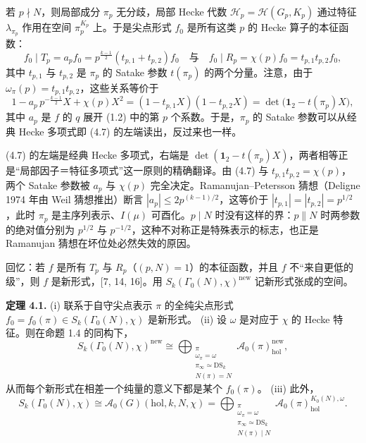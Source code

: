 若 $p\nmid N$，则局部成分 $\pi_p$ 无分歧，局部 Hecke 代数 $\mathcal{H}_p=\mathcal{H}(G_p,K_p)$ 通过特征 $\lambda_{\pi_p}$ 作用在空间 $\pi_p^{K_p}$ 上。于是尖点形式 $f_0$ 是所有这类 $p$ 的 Hecke 算子的本征函数：
\begin{equation*}\tag{4.6}
f_0\mid T_p=a_pf_0=p^{\frac{k-1}{2}}(t_{p,1}+t_{p,2})f_0
\quad\text{与}\quad
f_0\mid R_p=\chi(p)f_0=t_{p,1}t_{p,2}f_0 ,
\end{equation*}
其中 $t_{p,1}$ 与 $t_{p,2}$ 是 $\pi_p$ 的 Satake 参数 $t(\pi_p)$ 的两个分量。注意，由于 $\omega_\pi(p)=t_{p,1}t_{p,2}$，这些关系等价于
\begin{equation*}\tag{4.7}
1-a_p\,p^{-\frac{k-1}{2}}X+\chi(p)X^2=(1-t_{p,1}X)(1-t_{p,2}X)=\det\bigl(\mathbf{1}_2-t(\pi_p)X\bigr),
\end{equation*}
其中 $a_p$ 是 $f$ 的 $q$ 展开 (1.2) 中的第 $p$ 个系数。于是，$\pi_p$ 的 Satake 参数可以从经典 Hecke 多项式即 (4.7) 的左端读出，反过来也一样。

\begin{annote}
(4.7) 的左端是经典 Hecke 多项式，右端是 $\det(\mathbf{1}_2-t(\pi_p)X)$，两者相等正是“局部因子＝特征多项式”这一原则的精确翻译。由 (4.7) 与 $t_{p,1}t_{p,2}=\chi(p)$，两个 Satake 参数被 $a_p$ 与 $\chi(p)$ 完全决定。Ramanujan–Petersson 猜想（Deligne 1974 年由 Weil 猜想推出）断言 $|a_p|\le2p^{(k-1)/2}$，这等价于 $|t_{p,1}|=|t_{p,2}|=p^{1/2}$，此时 $\pi_p$ 是主序列表示、$I(\mu)$ 可酉化。$p\mid N$ 时没有这样的界：$p\|N$ 时两参数的绝对值分别为 $p^{1/2}$ 与 $p^{-1/2}$，这种不对称正是特殊表示的标志，也正是 Ramanujan 猜想在坏位处必然失效的原因。

\par{}
\end{annote}

回忆：若 $f$ 是所有 $T_p$ 与 $R_p$（$(p,N)=1$）的本征函数，并且 $f$ 不“来自更低的级”，则 $f$ 是新形式，[7, 14, 16]。用 $S_k(\Gamma_0(N),\chi)^{\mathrm{new}}$ 记新形式张成的空间。

\medskip\noindent\textbf{定理 4.1.}\quad
(i) 联系于自守尖点表示 $\pi$ 的全纯尖点形式 $f_0=f_0(\pi)\in S_k(\Gamma_0(N),\chi)$ 是新形式。
(ii) 设 $\omega$ 是对应于 $\chi$ 的 Hecke 特征。则在命题 1.4 的同构下，
\[
S_k(\Gamma_0(N),\chi)^{\mathrm{new}}\cong
\bigoplus_{\substack{\pi\\ \omega_\pi=\omega\\ \pi_\infty\simeq\mathrm{DS}_k\\ N(\pi)=N}}
\mathcal{A}_0(\pi)^{\mathrm{new}}_{\mathrm{hol}},
\]
从而每个新形式在相差一个纯量的意义下都是某个 $f_0(\pi)$。
(iii) 此外，
\[
S_k(\Gamma_0(N),\chi)\cong\mathcal{A}_0(G)(\mathrm{hol},k,N,\chi)=
\bigoplus_{\substack{\pi\\ \omega_\pi=\omega\\ \pi_\infty\simeq\mathrm{DS}_k\\ N(\pi)\mid N}}
\mathcal{A}_0(\pi)^{K_0(N),\omega}_{\mathrm{hol}} .
\]

